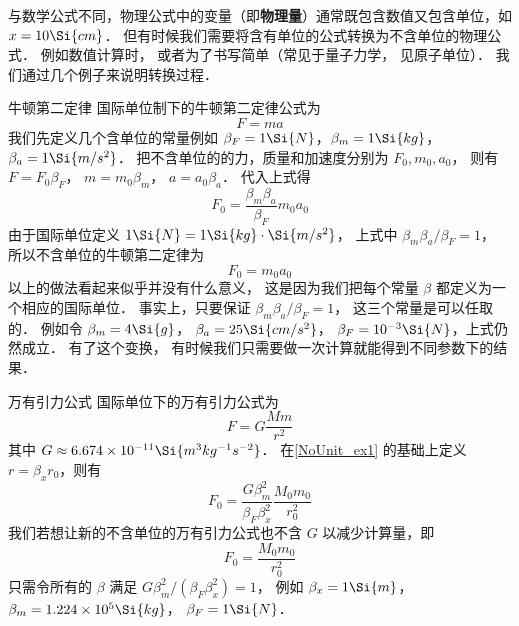 

与数学公式不同，物理公式中的变量（即\textbf{物理量}）通常既包含数值又包含单位，如 $x = 10\Si{cm}$． 但有时候我们需要将含有单位的公式转换为不含单位的物理公式． 例如数值计算时， 或者为了书写简单（常见于量子力学， 见原子单位）． 我们通过几个例子来说明转换过程．

\begin{example}{牛顿第二定律}\label{NoUnit_ex1}
国际单位制下的牛顿第二定律公式为
\begin{equation}
F = ma
\end{equation}
我们先定义几个含单位的常量例如 $\beta_{F} = 1\Si{N}$，$\beta_{m} = 1\Si{kg}$，$\beta_{a} = 1\Si{m/s^2}$． 把不含单位的的力，质量和加速度分别为 $F_0, m_0, a_0$， 则有 $F = F_0 \beta_F$， $m = m_0 \beta_{m}$， $a = a_0 \beta_{a}$． 代入上式得
\begin{equation}
F_0 = \frac{\beta_m \beta_a}{\beta_F} m_0  a_0
\end{equation}
由于国际单位定义 $1\Si{N} = 1\Si{kg}\cdot\Si{m/s^2}$， 上式中 $\beta_m \beta_a/\beta_F = 1$， 所以不含单位的牛顿第二定律为
\begin{equation}\label{NoUnit_eq3}
F_0 = m_0 a_0
\end{equation}
以上的做法看起来似乎并没有什么意义， 这是因为我们把每个常量 $\beta$ 都定义为一个相应的国际单位． 事实上，只要保证 $\beta_m \beta_a/\beta_F = 1$， 这三个常量是可以任取的． 例如令 $\beta_m = 4\Si{g}$， $\beta_a = 25\Si{cm/s^2}$， $\beta_F = 10^{-3}\Si{N}$，上式仍然成立． 有了这个变换， 有时候我们只需要做一次计算就能得到不同参数下的结果．
\end{example}

\begin{example}{万有引力公式}
国际单位下的万有引力公式为
\begin{equation}
F = G\frac{Mm}{r^2}
\end{equation}
其中 $G \approx 6.674\times 10^{-11} \Si{m^3 kg^{-1} s^{-2}}$． 在\autoref{NoUnit_ex1} 的基础上定义 $r = \beta_x r_0$，则有
\begin{equation}
F_0 = \frac{G\beta_m^2}{\beta_F \beta_x^2} \frac{M_0 m_0}{r_0^2}
\end{equation}
我们若想让新的不含单位的万有引力公式也不含 $G$ 以减少计算量，即
\begin{equation}\label{NoUnit_eq6}
F_0 = \frac{M_0 m_0}{r_0^2}
\end{equation}
只需令所有的 $\beta$ 满足 $G\beta_m^2/(\beta_F\beta_x^2) = 1$， 例如 $\beta_x = 1\Si{m}$， $\beta_m = 1.224\times 10^5 \Si{kg}$， $\beta_F = 1\Si{N}$．
\end{example}

